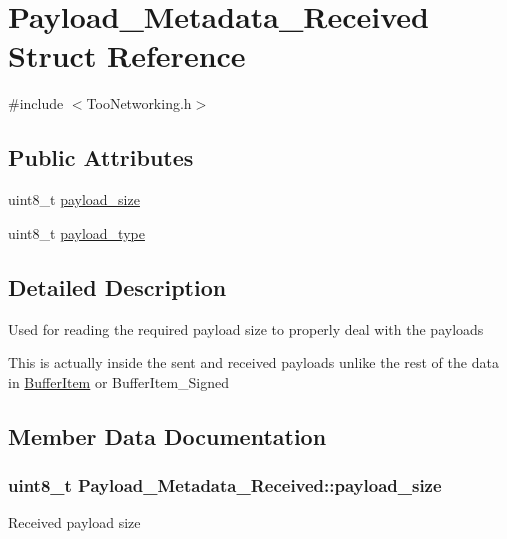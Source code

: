 \hypertarget{structPayload__Metadata__Received}{}\section{Payload\+\_\+\+Metadata\+\_\+\+Received Struct Reference}
\label{structPayload__Metadata__Received}


{\ttfamily \#include $<$Too\+Networking.\+h$>$}

\subsection*{Public Attributes}
\begin{DoxyCompactItemize}
\item 
uint8\+\_\+t \hyperlink{structPayload__Metadata__Received_a4dcd8b5b8c5a4565f1bac2fc4212bf71}{payload\+\_\+size}
\item 
uint8\+\_\+t \hyperlink{structPayload__Metadata__Received_a0105d708c3cc157a95c3cf4068e290de}{payload\+\_\+type}
\end{DoxyCompactItemize}


\subsection{Detailed Description}
Used for reading the required payload size to properly deal with the payloads

This is actually inside the sent and received payloads unlike the rest of the data in \hyperlink{structBufferItem}{Buffer\+Item} or Buffer\+Item\+\_\+\+Signed 

\subsection{Member Data Documentation}
\subsubsection[{\texorpdfstring{payload\+\_\+size}{payload_size}}]{\setlength{\rightskip}{0pt plus 5cm}uint8\+\_\+t Payload\+\_\+\+Metadata\+\_\+\+Received\+::payload\+\_\+size}\hypertarget{structPayload__Metadata__Received_a4dcd8b5b8c5a4565f1bac2fc4212bf71}{}\label{structPayload__Metadata__Received_a4dcd8b5b8c5a4565f1bac2fc4212bf71}
Received payload size 
